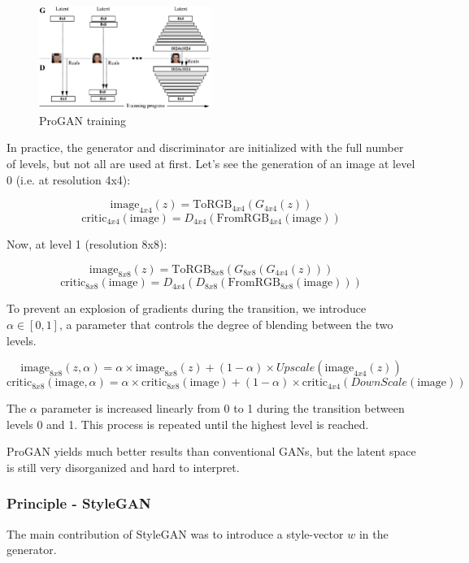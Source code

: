 \documentclass{article}
\begin{document}
\begin{figure}[H]
    \centering
    \includegraphics[width=0.5\textwidth]{images/progan.png}
    \caption{ProGAN training}
\end{figure}

In practice, the generator and discriminator are initialized with the full number of levels, but not all are used at first. Let's see the generation of an image at level 0 (i.e. at resolution 4x4):

\[\text{image}_{4x4}(z) = \text{ToRGB}_{4x4}(G_{4x4}(z))\]
\[\text{critic}_{4x4}(\text{image}) = D_{4x4}(\text{FromRGB}_{4x4}(\text{image}))\]

Now, at level 1 (resolution 8x8):

\[\text{image}_{8x8}(z) = \text{ToRGB}_{8x8}(G_{8x8}(G_{4x4}(z)))\]
\[\text{critic}_{8x8}(\text{image}) = D_{4x4}(D_{8x8}(\text{FromRGB}_{8x8}(\text{image})))\]

To prevent an explosion of gradients during the transition, we introduce $\alpha \in \left[0, 1\right]$, a parameter that controls the degree of blending between the two levels.

\[\text{image}_{8x8}(z, \alpha) = \alpha \times \text{image}_{8x8}(z) + (1-\alpha) \times Upscale(\text{image}_{4x4}(z))\]
\[\text{critic}_{8x8}(\text{image}, \alpha) = \alpha \times \text{critic}_{8x8}(\text{image}) + (1-\alpha) \times \text{critic}_{4x4}(DownScale(\text{image}))\]

The $\alpha$ parameter is increased linearly from 0 to 1 during the transition between levels 0 and 1. This process is repeated until the highest level is reached. 

ProGAN yields much better results than conventional GANs, but the latent space is still very disorganized and hard to interpret.

\subsubsection*{Principle - StyleGAN}

The main contribution of StyleGAN was to introduce a style-vector $w$ in the generator.
\end{document}
